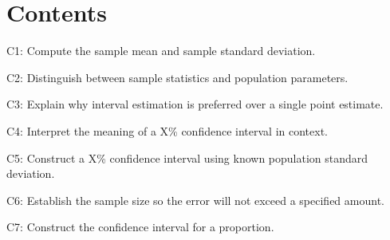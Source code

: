 

	
	\section*{Contents}
	\setcounter{tocdepth}{1}
	\setcounter{secnumdepth}{1}
	\tableofcontents
	
	\begin{ExamCriteria}
		\item C1: Compute the sample mean and sample standard deviation.
		\item C2: Distinguish between sample statistics and population parameters.
		\item C3: Explain why interval estimation is preferred over a single point estimate.
		\item C4: Interpret the meaning of a X\% confidence interval in context.
		\item C5: Construct a X\% confidence interval using known population standard deviation.
		\item C6: Establish the sample size so the error will not exceed a specified amount.
		\item C7: Construct the confidence interval for a proportion.
	\end{ExamCriteria}
	
